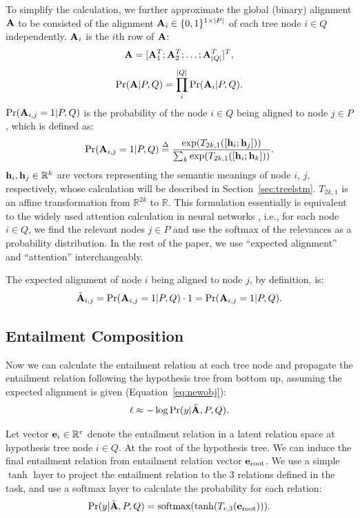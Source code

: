 To simplify the calculation, we further
approximate the global (binary) alignment $\mathbf{A}$
to be consisted of the alignment 
$\mathbf{A}_i \in \{0, 1\}^{1\times |P|}$ 
of each tree node $i\in Q$
independently. $\mathbf{A}_i$ is the $i$th row of $\mathbf{A}$:
\[\mathbf{A} = [\mathbf{A}_1^T;\mathbf{A}_2^T;\dots;\mathbf{A}_{\lvert Q\rvert}^T]^T,\]\vspace{-0.2in}
\[\mathrm{Pr}(\mathbf{A}|P, Q) = \prod_i^{\lvert Q\rvert} \mathrm{Pr}(\mathbf{A}_i|P, Q).\]
$\mathrm{Pr}(\mathbf{A}_{i,j}=1|P, Q)$ is the probability 
of the node $i\in Q$ being aligned to node $j\in P$,
which is defined as:
\begin{equation}
\mathrm{Pr}(\mathbf{A}_{i,j}=1|P, Q) \stackrel{\Delta}{=} 
\frac{\exp(T_{2k, 1}([\mathbf{h}_i;\mathbf{h}_j]))}{\sum_k\exp(T_{2k, 1}([\mathbf{h}_i;\mathbf{h}_k]))}.\label{eq:att}
\end{equation}
$\mathbf{h}_i, \mathbf{h}_j \in \mathbb{R}^k$ are vectors representing the semantic meanings of node $i$, $j$, respectively,
whose calculation will be described in Section~\ref{sec:treelstm}.
$T_{2k,1}$ is an affine transformation 
from $\mathbb{R}^{2k}$ to $\mathbb{R}$.
This formulation essentially is equivalent to 
the widely used attention
calculation in neural networks \cite{bahdanau2014neural}, i.e.,
for each node $i\in Q$, we find the relevant 
nodes $j\in P$ and use the softmax of the relevances 
as a probability distribution. In the rest of the paper,
we use ``expected alignment'' and ``attention'' interchangeably.

The expected alignment of node $i$ being aligned to node $j$, 
by definition, is:
\[
\tilde{\mathbf{A}}_{i,j} = \mathrm{Pr}(\mathbf{A}_{i,j}=1|P,Q) \cdot 1 = \mathrm{Pr}(\mathbf{A}_{i,j}=1|P,Q).
\]

\subsection{Entailment Composition}
\label{sec:ent}

Now we can calculate the entailment relation at each tree node
and propagate the entailment relation following
the hypothesis tree from bottom up, assuming the expected alignment
is given (Equation~\ref{eq:newobj}):
\[\ell \approx -\log \mathrm{Pr}(y|\tilde{\mathbf{A}}, P, Q).
\]

Let vector $\mathbf{e}_i \in \mathbb{R}^r$ denote the entailment relation in a 
latent relation space
at hypothesis tree node $i\in Q$. 
At the root of the hypothesis tree.
We can induce the final entailment relation from entailment relation vector
 $\mathbf{e}_{\text{root}}$. We use a simple $\tanh$ layer
to project the entailment relation to the 3 relations
defined in the task, and use a softmax layer to 
calculate the probability for each relation:
\[
\mathrm{Pr}(y|\tilde{\mathbf{A}}, P, Q) = \text{softmax}(\tanh (T_{r, 3}( \mathbf{e}_{\text{root}}))).
\]

